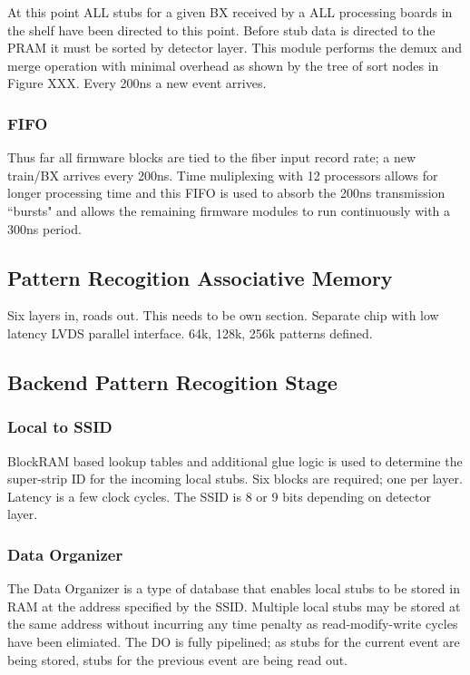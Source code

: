 \documentclass[letterpaper]{article}
\begin{document}
At this point ALL stubs for a given BX received by a ALL processing boards in the shelf have been directed to this point.  Before stub data is directed to the PRAM it must be sorted by detector layer.  This module performs the demux and merge operation with minimal overhead as shown by the tree of sort nodes in Figure XXX.  Every 200ns a new event arrives.

\subsubsection{FIFO}

Thus far all firmware blocks are tied to the fiber input record rate; a new train/BX arrives every 200ns.  Time muliplexing with 12 processors allows for longer processing time and this FIFO is used to absorb the 200ns transmission ``bursts" and allows the remaining firmware modules to run continuously with a 300ns period.

\subsection{Pattern Recogition Associative Memory}

Six layers in, roads out.  This needs to be own section.  Separate chip with low latency LVDS parallel interface.  64k, 128k, 256k patterns defined.

\subsection{Backend Pattern Recogition Stage}

\subsubsection{Local to SSID}

BlockRAM based lookup tables and additional glue logic is used to determine the super-strip ID for the incoming local stubs.  Six blocks are required; one per layer.  Latency is a few clock cycles.  The SSID is 8 or 9 bits depending on detector layer.

\subsubsection{Data Organizer}

The Data Organizer is a type of database that enables local stubs to be stored in RAM at the address specified by the SSID.  Multiple local stubs may be stored at the same address without incurring any time penalty as read-modify-write cycles have been elimiated.  The DO is fully pipelined; as stubs for the current event are being stored, stubs for the previous event are being read out.
\end{document}
